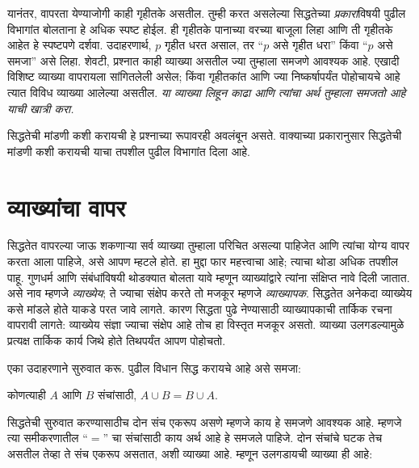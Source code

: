 यानंतर, वापरता येण्याजोगी काही गृहीतके असतील. तुम्ही करत असलेल्या सिद्धतेच्या \emph{प्रकारा}विषयी पुढील विभागांत बोलताना हे अधिक स्पष्ट होईल. ही गृहीतके पानाच्या वरच्या बाजूला लिहा आणि ती गृहीतके आहेत हे स्पष्टपणे दर्शवा. उदाहरणार्थ, $p$ गृहीत धरत असाल, तर “$p$ असे गृहीत धरा” किंवा “$p$ असे समजा” असे लिहा. शेवटी, प्रश्नात काही व्याख्या असतील ज्या तुम्हाला समजणे आवश्यक आहे. एखादी विशिष्ट व्याख्या वापरायला सांगितलेली असेल; किंवा गृहीतकांत आणि ज्या निष्कर्षापर्यंत पोहोचायचे आहे त्यात विविध व्याख्या आलेल्या असतील. \emph{या व्याख्या लिहून काढा आणि त्यांचा अर्थ तुम्हाला समजतो आहे याची खात्री करा.}

सिद्धतेची मांडणी कशी करायची हे प्रश्नाच्या रूपावरही अवलंबून असते. वाक्याच्या प्रकारानुसार सिद्धतेची मांडणी कशी करायची याचा तपशील पुढील विभागांत दिला आहे.












\section{व्याख्यांचा वापर}\label{mth:prf:def:sec}

सिद्धतेत वापरल्या जाऊ शकणाऱ्या सर्व व्याख्या तुम्हाला परिचित असल्या पाहिजेत आणि त्यांचा योग्य वापर करता आला पाहिजे, असे आपण म्हटले होते. हा मुद्दा फार महत्त्वाचा आहे; त्याचा थोडा अधिक तपशील पाहू. गुणधर्म आणि संबंधांविषयी थोडक्यात बोलता यावे म्हणून व्याख्यांद्वारे त्यांना संक्षिप्त नावे दिली जातात. असे नाव म्हणजे \emph{व्याख्येय}; ते ज्याचा संक्षेप करते तो मजकूर म्हणजे \emph{व्याख्यापक}. सिद्धतेत अनेकदा व्याख्येय कसे मांडले होते याकडे परत जावे लागते. कारण सिद्धता पुढे नेण्यासाठी व्याख्यापकाची तार्किक रचना वापरावी लागते: व्याख्येय संज्ञा ज्याचा संक्षेप आहे तोच हा विस्तृत मजकूर असतो. व्याख्या उलगडल्यामुळे प्रत्यक्ष तार्किक कार्य जिथे होते तिथपर्यंत आपण पोहोचतो.

एका उदाहरणाने सुरुवात करू. पुढील विधान सिद्ध करायचे आहे असे समजा:

\begin{prop}
कोणत्याही $A$ आणि $B$ संचांसाठी, $A \cup B = B \cup A$.
\end{prop}

सिद्धतेची सुरुवात करण्यासाठीच दोन संच एकरूप असणे म्हणजे काय हे समजणे आवश्यक आहे. म्हणजे त्या समीकरणातील “$=$” चा संचांसाठी काय अर्थ आहे हे समजले पाहिजे. दोन संचांचे घटक तेच असतील तेव्हा ते संच एकरूप असतात, अशी व्याख्या आहे. म्हणून उलगडायची व्याख्या ही आहे:

